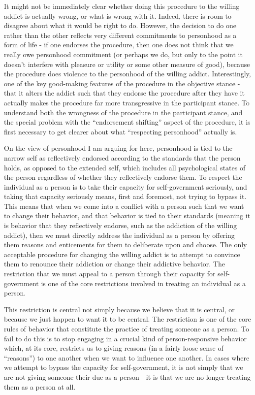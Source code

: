 \documentclass[phd,12pt,oneside,paper=letterpaper]{ubcthesis}
\begin{document}
It might not be immediately clear whether doing this procedure to the willing addict is actually wrong, or what is wrong with it. Indeed, there is room to disagree about what it would be right to do. However, the decision to do one rather than the other reflects very different commitments to personhood as a form of life - if one endorses the procedure, then one does not think that we really owe personhood commitment (or perhaps we do, but only to the point it doesn't interfere with pleasure or utility or some other measure of good), because the procedure does violence to the personhood of the willing addict. Interestingly, one of the key good-making features of the procedure in the objective stance - that it alters the addict such that they endorse the procedure after they have it actually makes the procedure far more transgressive in the participant stance. To understand both the wrongness of the procedure in the participant stance, and the special problem with the ``endorsement shifting'' aspect of the procedure, it is first necessary to get clearer about what ``respecting personhood'' actually is. 

On the view of personhood I am arguing for here, personhood is tied to the narrow self as reflectively endorsed according to the standards that the person holds, as opposed to the extended self, which includes all psychological states of the person regardless of whether they reflectively endorse them. To respect the individual as a person is to take their capacity for self-government seriously, and taking that capacity seriously means, first and foremost, not trying to bypass it. This means that when we come into a conflict with a person such that we want to change their behavior, and that behavior is tied to their standards (meaning it is behavior that they reflectively endorse, such as the addiction of the willing addict), then we must directly address the individual as a person by offering them reasons and enticements for them to deliberate upon and choose. The only acceptable procedure for changing the willing addict is to attempt to convince them to renounce their addiction or change their addictive behavior. The restriction that we must appeal to a person through their capacity for self-government is one of the core restrictions involved in treating an individual as a person. 

This restriction is central not simply because we believe that it is central, or because we just happen to want it to be central. The restriction is one of the core rules of behavior that constitute the practice of treating someone as a person. To fail to do this is to stop engaging in a crucial kind of person-responsive behavior which, at its core, restricts us to giving reasons (in a fairly loose sense of ``reasons'') to one another when we want to influence one another. In cases where we attempt to bypass the capacity for self-government, it is not simply that we are not giving someone their due as a person - it is that we are no longer treating them as a person at all.
\end{document}
